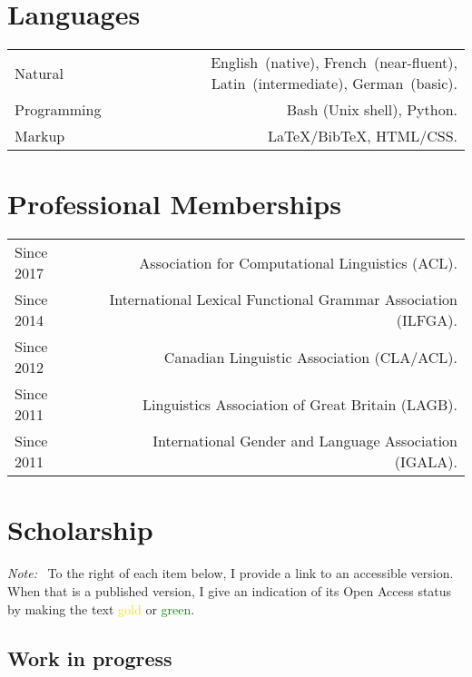 \documentclass[11pt,a4paper,twoside]{article}
\makeatletter
\newenvironment{cvsection}{%
  \setlength{\extrarowheight}{0.70ex}
  \begin{longtable}[l]{@{} L R @{}}
}{%
  \end{longtable}
}
\newcommand{\note}{\emph{Note: }}
\newcommand{\Label}[1]{%
\textnormal{#1}%
}
\makeatother
\begin{document}
\newpage
\section*{Languages}

\begin{cvsection}
  \Label{Natural}      & English~(native), French~(near-fluent),
                          Latin~(intermediate), German~(basic). \\
  \Label{Programming}  & Bash (Unix shell), Python. \\
  \Label{Markup}       & \LaTeX*\slash Bib\TeX*, HTML\slash CSS.
\end{cvsection}


\section*{Professional Memberships}

\begin{cvsection}
  Since 2017	& Association for Computational Linguistics (ACL).\\
  Since 2014  & International Lexical Functional Grammar Association (ILFGA).\\
  Since 2012 	& Canadian Linguistic Association (CLA\slash ACL).\\
  Since 2011 	& Linguistics Association of Great Britain (LAGB).\\
  Since 2011 	& International Gender and Language Association (IGALA).\\
\end{cvsection}


\newpage

\section*{Scholarship}  \label{scholarship}

\note\ To the right of each item below, I provide a link to an accessible version. When that is a published version, I give an indication of its Open Access status by making the text \textcolor{gold}{gold} or \textcolor{green}{green}.

\subsection*{Work in progress}
\end{document}
